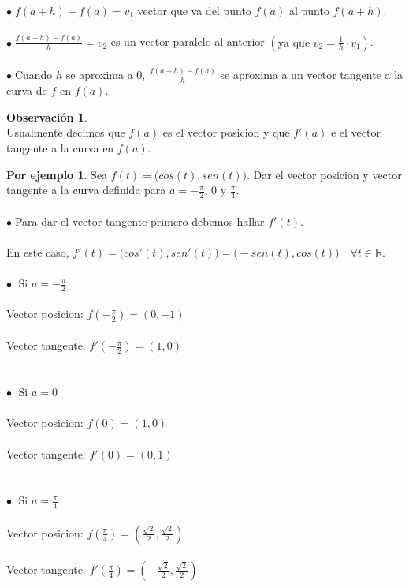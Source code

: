 \documentclass{article}
\theoremstyle{definition}
\theoremstyle{definition}
\newtheorem*{obs}{Observación}
\newtheorem*{ej}{Por ejemplo}
\theoremstyle{remark}
\newcommand\bl{$\bullet\;$}
\begin{document}
\quad \bl $f(a+h)-f(a)=v_1$ vector que va del punto $f(a)$ al punto $f(a+h)$. \\\\
\quad \bl $\frac{f(a+h)-f(a)}{h}=v_2$ es un vector paralelo al anterior $\left(\text{ya que }v_2=\frac{1}{h}\cdot v_1\right)$. \\\\
\bl Cuando $h$ se aproxima a $0$, $\frac{f(a+h)-f(a)}{h}$ se aproxima a un vector tangente a la curva de $f$ en $f(a)$.
\begin{obs}
  \; \\
  Usualmente decimos que $f(a)$ es el vector posicion y que $f'(a)$ e el vector tangente a la curva en $f(a)$.
\end{obs} \; \pagebreak
\begin{ej}
  Sea $f(t) = \big(cos(t),sen(t)\big).$ Dar el vector posicion y vector tangente a la curva definida para $a=-\frac{\pi}{2}$, $0$ y $\frac{\pi}{4}$. \\\\ 
  \bl Para dar el vector tangente primero debemos hallar $f'(t)$. \\\\
  \phantom{\bl} En este caso, $f'(t)=\big(cos'(t),sen'(t)\big)=\big(-sen(t),cos(t)\big) \quad \forall t \in \mathbb{R}$.\\\\ 
  \textcolor{rojop2}{\bl} Si $a= -\frac{\pi}{2}$ \\\\
  \quad \quad Vector posicion: $f\left(-\frac{\pi}{2}\right)=(0,-1)$\\\\
    \quad \quad Vector tangente: $f'\left(-\frac{\pi}{2}\right)=(1,0)$ \\ \\ \\ 
    \textcolor{rojop2}{\bl} Si $a=0$ \\\\
      \quad \quad Vector posicion: $f\left(0\right)=(1,0)$\\\\
    \quad \quad Vector tangente: $f'\left(0\right)=(0,1)$\\ \\ \\ 
    \textcolor{rojop2}{\bl} Si $a=\frac{\pi}{4}$ \\\\
    \quad \quad Vector posicion: $f\left(\frac{\pi}{4}\right)=\left(\frac{\sqrt{2}}{2},\frac{\sqrt{2}}{2}\right)$\\\\
    \quad \quad Vector tangente: $f'\left(\frac{\pi}{4}\right)=\left(-\frac{\sqrt{2}}{2},\frac{\sqrt{2}}{2}\right)$
\end{ej}
\begin{figure}[h]
\centering
\def\svgwidth{0.95\textwidth}

\end{figure}
\end{document}
